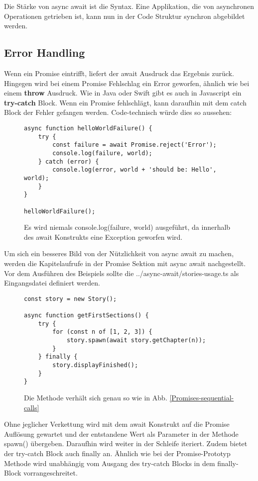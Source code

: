 \noindent
Die Stärke von async await ist die Syntax. Eine Applikation, die von asynchronen Operationen getrieben ist, kann nun in der Code Struktur synchron abgebildet werden. 

\subsection{Error Handling}
Wenn ein Promise eintrifft, liefert der await Ausdruck das Ergebnis zurück. Hingegen wird bei einem Promise Fehlschlag ein Error geworfen, ähnlich wie bei einem \textbf{throw} Ausdruck. Wie in Java oder Swift gibt es auch in Javascript ein \textbf{try-catch} Block. Wenn ein Promise fehlschlägt, kann daraufhin mit dem catch Block der Fehler gefangen werden. Code-technisch würde dies so aussehen: 

\begin{figure}[H]
\begin{lstlisting}[basicstyle=\small]
async function helloWorldFailure() {
    try {
        const failure = await Promise.reject('Error');
        console.log(failure, world);
    } catch (error) {
        console.log(error, world + 'should be: Hello', world);
    }
}

helloWorldFailure();
\end{lstlisting}
\caption{Es wird niemals console.log(failure, world) ausgeführt, da innerhalb des await Konstrukts eine Exception geworfen wird.}
\end{figure}

\noindent
Um sich ein besseres Bild von der Nützlichkeit von async await zu machen, werden die Kapitelaufrufe in der Promise Sektion mit async await nachgestellt. Vor dem Ausführen des Beispiels sollte die ../async-await/stories-usage.ts als Eingangsdatei definiert werden.


\begin{figure}[H]
\begin{lstlisting}[basicstyle=\small]
const story = new Story();

async function getFirstSections() {
    try {
        for (const n of [1, 2, 3]) {
            story.spawn(await story.getChapter(n));
        }
    } finally {
        story.displayFinished();
    }
}
\end{lstlisting}
\caption{Die Methode verhält sich genau so wie in Abb. \ref{Promises-sequential-calls}}
\end{figure}

\noindent
Ohne jeglicher Verkettung wird mit dem await Konstrukt auf die Promise Auflösung gewartet und der entstandene Wert als Parameter in der Methode spawn() übergeben. Daraufhin wird weiter in der Schleife iteriert. Zudem bietet der try-catch Block auch finally an. Ähnlich wie bei der Promise-Prototyp Methode wird unabhängig vom Ausgang des try-catch Blocks in dem finally-Block vorrangeschreitet.

